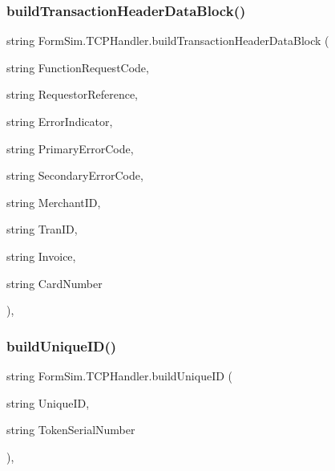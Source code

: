 \subsubsection{\texorpdfstring{build\+Transaction\+Header\+Data\+Block()}{buildTransactionHeaderDataBlock()}}
{\footnotesize\ttfamily string Form\+Sim.\+T\+C\+P\+Handler.\+build\+Transaction\+Header\+Data\+Block (\begin{DoxyParamCaption}\item[{string}]{Function\+Request\+Code,  }\item[{string}]{Requestor\+Reference,  }\item[{string}]{Error\+Indicator,  }\item[{string}]{Primary\+Error\+Code,  }\item[{string}]{Secondary\+Error\+Code,  }\item[{string}]{Merchant\+ID,  }\item[{string}]{Tran\+ID,  }\item[{string}]{Invoice,  }\item[{string}]{Card\+Number }\end{DoxyParamCaption})\hspace{0.3cm}{\ttfamily [inline]}, {\ttfamily [private]}}

\mbox{\label{class_form_sim_1_1_t_c_p_handler_ac8e49c8548bb66c3239b6f711afa3337}} 
\subsubsection{\texorpdfstring{build\+Unique\+I\+D()}{buildUniqueID()}}
{\footnotesize\ttfamily string Form\+Sim.\+T\+C\+P\+Handler.\+build\+Unique\+ID (\begin{DoxyParamCaption}\item[{string}]{Unique\+ID,  }\item[{string}]{Token\+Serial\+Number }\end{DoxyParamCaption})\hspace{0.3cm}{\ttfamily [inline]}, {\ttfamily [private]}}

\mbox{\label{class_form_sim_1_1_t_c_p_handler_a380074a847d4b03c770e89785ff82862}} 
